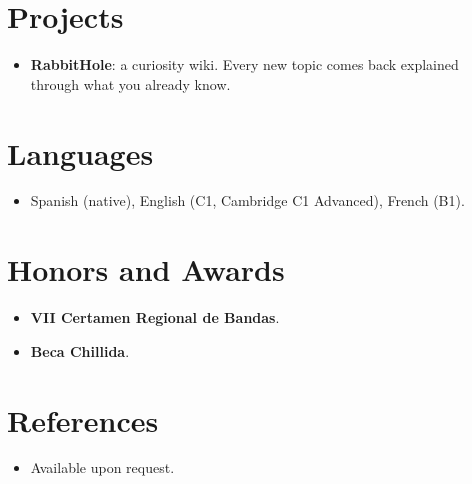 \documentclass[11pt,a4paper,sans]{moderncv}
\begin{document}

\section{Projects}
\vspace{1pt}
\begin{itemize}
\item \textbf{RabbitHole}: a curiosity wiki. Every new topic comes back explained through what you already know.
\end{itemize}


\section{Languages}
\vspace{1pt}
\begin{itemize}
\item Spanish (native), English (C1, Cambridge C1 Advanced), French (B1).
\end{itemize}


\section{Honors and Awards}
\vspace{1pt}
\begin{itemize}
\item{\textbf{VII Certamen Regional de Bandas}.}
\item{\textbf{Beca Chillida}.}
\end{itemize}


\section{References}
\vspace{1pt}
\begin{itemize}
\item{Available upon request.}
\end{itemize}
\end{document}
